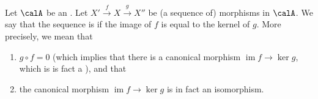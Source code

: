 \begin{definition} \label{definition:exact_sequence_of_morphisms_in_an_abelian_category}
    Let $\calA$ be an . Let $X' \xrightarrow{f} X \xrightarrow{g} X''$ be (a sequence of) morphisms in $\calA$.
    We say that the sequence is  if the image of $f$ is equal to the kernel of $g$. More precisely, we mean that
    \begin{enumerate}
        \item $g \circ f = 0$ (which implies that there is a canonical morphism $\operatorname{im} f \to \ker g$, which is is fact a ), and that
        \item the canonical morphism $\operatorname{im} f \to \ker g$ is in fact an isomorphism.
    \end{enumerate}
\end{definition}